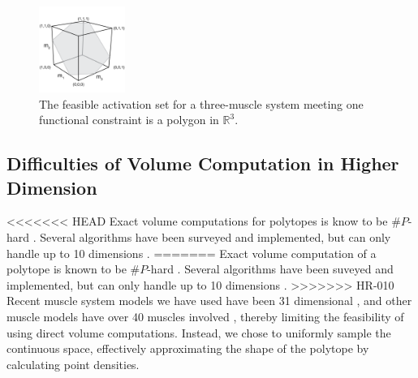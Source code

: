 \begin{figure}[ht]
  \label{fig:fig_hr}
   \begin{center}
    \includegraphics[width=0.25\textwidth]{sections/figs/feasibleactivation.png}
  \end{center}
  \caption{The feasible activation set for a  three-muscle system meeting one functional constraint is a polygon in $\mathbb{R}^3$.} %
\end{figure}

\subsection{Difficulties of Volume Computation in Higher Dimension}

<<<<<<< HEAD
Exact volume computations for polytopes is know to be $\#P$-hard \cite{Dyer}. Several algorithms have been surveyed and implemented, but can only handle up to 10 dimensions \cite{Bueler2}.  
=======
Exact volume computation of a polytope is known to be $\#P$-hard \cite{Dyer}. Several algorithms have been suveyed and implemented, but can only handle up to 10 dimensions \cite{Bueler2}.  
>>>>>>> HR-010
Recent muscle system models we have used have been 31 dimensional \cite{Valero-Cuevas2015high-dimensional}, and other muscle models have over 40 muscles involved \cite{arnold2010model, kutch2012challenges, hamner2010muscle, de2014human}, thereby limiting the feasibility of using direct volume computations. Instead, we chose to uniformly sample the continuous space, effectively approximating the shape of the polytope by calculating point densities. %


